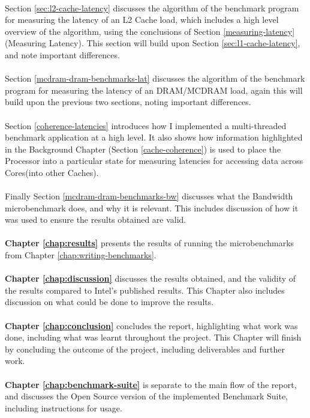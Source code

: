 \documentclass[bsc,frontabs,twoside,singlespacing,parskip,deptreport]{infthesis}     %
\begin{document}
\\
Section \ref{sec:l2-cache-latency} discusses the algorithm of the benchmark program for measuring the latency of an L2 Cache load, which includes a high level overview of the algorithm, using the conclusions of Section \ref{measuring-latency}(Measuring Latency). This section will build upon Section \ref{sec:l1-cache-latency}, and note important differences. \\
\\
Section \ref{mcdram-dram-benchmarks-lat} discusses the algorithm of the benchmark program for measuring the latency of an DRAM/MCDRAM load, again this will build upon the previous two sections, noting important differences. \\
\\
Section \ref{coherence-latencies} introduces how I implemented a multi-threaded benchmark application at a high level. It also shows how information highlighted in the Background Chapter (Section \ref{cache-coherence}) is used to place the Processor into a particular state for measuring latencies for accessing data across Cores(into other Caches). \\
\\
Finally Section \ref{mcdram-dram-benchmarks-bw} discusses what the Bandwidth microbenchmark does, and why it is relevant. This includes discussion of how it was used to ensure the results obtained are valid. \\
\\
\textbf{Chapter \ref{chap:results}} presents the results of running the microbenchmarks from Chapter \ref{chap:writing-benchmarks}. \\
\\
\textbf{Chapter \ref{chap:discussion}} discusses the results obtained, and the validity of the results compared to Intel's published results. This Chapter also includes discussion on what could be done to improve the results. \\
\\
\textbf{Chapter \ref{chap:conclusion}} concludes the report, highlighting what work was done, including what was learnt throughout the project. This Chapter will finish by concluding the outcome of the project, including deliverables and further work. \\
\\
\textbf{Chapter \ref{chap:benchmark-suite}} is separate to the main flow of the report, and discusses the Open Source version of the implemented Benchmark Suite, including instructions for usage.
\end{document}
